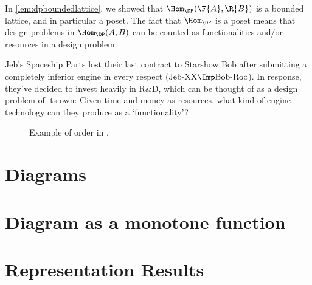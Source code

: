 

\begin{remark}
    In \cref{lem:dpboundedlattice}, we showed that $\Hom_{\DP}(\F{A},\R{B})$ is a bounded lattice, and in particular a poset. The fact that $\Hom_\DP$ is a poset means that design problems in $\Hom_\DP(A,B)$ can be counted as functionalities and/or resources in a design problem.
\end{remark}

\begin{example}
    \label{ex:rd}
    Jeb's Spaceship Parts lost their last contract to Starshow Bob after submitting a completely inferior engine in every respect ($\text{Jeb-XX} \Imp \text{Bob-Roc}$). In response, they've decided to invest heavily in R\&D, which can be thought of as a design problem of its own: Given time and money as resources, what kind of engine technology can they produce as a `functionality'?
\end{example}

\begin{figure}[h!]
    \begin{center}
    \end{center}
    \caption{Example of order in \DP. \label{fig:orderdp}}
\end{figure}


\section{Diagrams}\label{sec:higher-diagrams}


\section{Diagram as a monotone function}\label{sec:higher-diagram-as-function}


\section{Representation Results}\label{sec:higher-representation}
\todo{}

